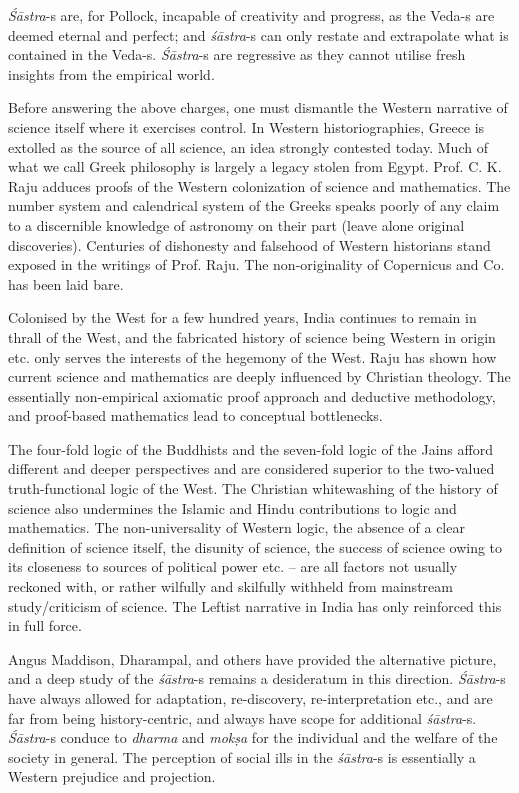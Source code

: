 \textit{Śāstra}-s are, for Pollock, incapable of creativity and progress, as the Veda-s are deemed eternal and perfect; and \textit{śāstra}-s can only restate and extrapolate what is contained in the Veda-s. \textit{Śāstra}-s are regressive as they cannot utilise fresh insights from the empirical world.

Before answering the above charges, one must dismantle the Western narrative of science itself where it exercises control. In Western historiographies, Greece is extolled as the source of all science, an idea strongly contested today. Much of what we call Greek philosophy is largely a legacy stolen from Egypt. Prof. C. K. Raju adduces proofs of the Western colonization of science and mathematics. The number system and calendrical system of the Greeks speaks poorly of any claim to a discernible knowledge of astronomy on their part (leave alone original discoveries). Centuries of dishonesty and falsehood of Western historians stand exposed in the writings of Prof. Raju. The non-originality of Copernicus and Co. has been laid bare. 

Colonised by the West for a few hundred years, India continues to remain in thrall of the West, and the fabricated history of science being Western in origin etc. only serves the interests of the hegemony of the West. Raju has shown how current science and mathematics are deeply influenced by Christian theology. The essentially non-empirical axiomatic proof approach and deductive methodology, and proof-based mathematics lead to conceptual bottlenecks.

The four-fold logic of the Buddhists and the seven-fold logic of the Jains afford different and deeper perspectives and are considered superior to the two-valued truth-functional logic of the West. The Christian whitewashing of the history of science also undermines the Islamic and Hindu contributions to logic and mathematics. The non-universality of Western logic, the absence of a clear definition of science itself, the disunity of science, the success of science owing to its closeness to sources of political power etc. – are all factors not usually reckoned with, or rather wilfully and skilfully withheld from mainstream study/criticism of science. The Leftist narrative in India has only reinforced this in full force.

Angus Maddison, Dharampal, and others have provided the alternative picture, and a deep study of the \textit{śāstra}-s remains a desideratum in this direction. \textit{Śāstra}-s have always allowed for adaptation, re-discovery, re-interpretation etc., and are far from being history-centric, and always have scope for additional \textit{śāstra}-s. \textit{Śāstra}-s conduce to \textit{dharma} and \textit{mokṣa} for the individual and the welfare of the society in general. The perception of social ills in the \textit{śāstra}-s is essentially a Western prejudice and projection.

